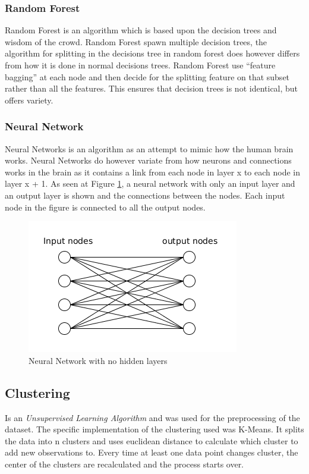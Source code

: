 \subsubsection{Random Forest}
Random Forest is an algorithm which is based upon the decision trees and wisdom of the crowd.
Random Forest spawn multiple decision trees, the algorithm for splitting in the decisions tree in random forest does however differs from how it is done in normal decisions trees.
Random Forest use ``feature bagging'' at each node and then decide for the splitting feature on that subset rather than all the features. This ensures that decision trees is not identical, but offers variety.

\subsubsection{Neural Network}
Neural Networks is an algorithm as an attempt to mimic how the human brain works.
Neural Networks do however variate from how neurons and connections works in the brain as it contains a link from each node in layer x to each node in layer x + 1. As seen at Figure \ref{fig:neuralnetwork}, a neural network with only an input layer and an output layer is shown and the connections between the nodes. Each input node in the figure is connected to all the output nodes.

\begin{figure}
  \centering
  \includegraphics[width=0.7\linewidth]{Images/neuralnetwork}
  \caption{Neural Network with no hidden layers}
  \label{fig:neuralnetwork}
\end{figure}

\subsection{Clustering}
Is an \emph{Unsupervised Learning Algorithm} and was used for the preprocessing of the dataset. The specific implementation of the clustering used was K-Means. It splits the data into n clusters and uses euclidean distance to calculate which cluster to add new observations to. Every time at least one data point changes cluster, the center of the clusters are recalculated and the process starts over.